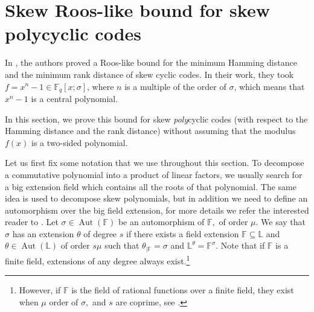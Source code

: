 \documentclass[12pt,paper]{article}
\newcommand{\hlc}[2][yellow]{ {\sethlcolor{#1} \hl{#2}} }
\theoremstyle{plain}
\newcommand{\Fq}{\mathbb{F}_{q}}
\DeclareMathOperator{\aut}{Aut}
\begin{document}
\section{ Skew Roos-like bound for skew polycyclic codes  }
In \cite{Alfarano2021}, the authors proved a Roos-like bound for the minimum Hamming distance and the minimum rank distance of skew cyclic codes. In their work, they took  $f=x^n-1 \in \Fq[x;\sigma]$, where  $n$ is a multiple of the order of $\sigma$, which means that $x^n-1 $ is a central polynomial.

In this section, we prove this bound for skew \emph{poly}cyclic codes (with respect to the Hamming distance and the rank distance) without assuming that the modulus $f(x)$ is a two-sided polynomial. 

Let us first fix some notation that we use throughout this section.  To decompose a commutative polynomial into a product of linear factors, we usually search for a big extension field which contains all the roots of that polynomial. The same idea is used to decompose skew polynomials, but  in addition we need to define an automorphism over the big field extension, for more details we refer the interested reader to \cite{Lobillo2017}.   Let $\sigma\in \aut(\mathbb{F})$ be an automorphism of $ \mathbb{F},$ of order $\mu.$ 
We say that $\sigma$ has an extension $\theta$ of degree $s$ if there exists a field extension $\mathbb{F} \subseteq \mathbb{L}$ and $\theta \in \aut(\mathbb{L})$ of order $s \mu$ such that $\theta_{\mid \mathbb{F}}=\sigma$ and $ \mathbb{L}^{\theta}=\mathbb{F}^{\sigma}.$ 
Note that if $\mathbb{F}$ is a finite field, extensions of any degree always exist.\footnote{However,  if $\mathbb{F}$ is the field of rational functions over a finite field, they exist when $\mu$  order of $\sigma,$ and $s$ are coprime, see \cite[Examples 2.4 and 2.5]{Lobillo2017}.}   
\end{document}
